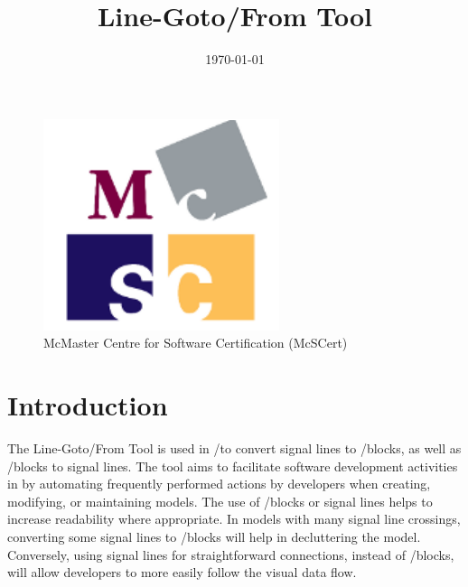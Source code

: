 \documentclass{article}
\makeatletter
\newcommand{\ToolName}{Line-Goto/From Tool\@\xspace}
\makeatother
\begin{document}
\title{\ToolName}
\date{\monthyeardate\today}
\maketitle
\vfill

\begin{figure}
	\centering
	\includegraphics[]{../figs/McSCert_Logo.pdf} \\
	McMaster Centre for Software Certification (McSCert)
\end{figure}

\newpage


\tableofcontents
\newpage

\section{Introduction}

The \ToolName is used in \Matlab/\Simulink to convert signal lines to \goto/\from blocks, as well as \goto/\from blocks to signal lines. 
The tool aims to facilitate software development activities in \Matlab \Simulink by automating frequently performed actions by developers when creating, modifying, or maintaining models. The use of \goto/\from blocks or signal lines helps to increase readability where appropriate. In models with many signal line crossings, converting some signal lines to \goto/\from blocks will help in decluttering the model. Conversely, using signal lines for straightforward connections, instead of \goto/\from blocks, will allow developers to more easily  follow the visual data flow.
\end{document}
